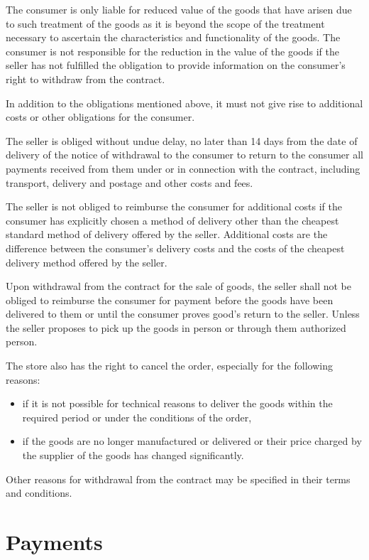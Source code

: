 \documentclass[thesis=M,english]{FITthesis}[2019/12/23]
\begin{document}
The consumer is only liable for reduced value of the goods that have arisen due to such treatment of the goods as it is beyond the scope of the treatment necessary to ascertain the characteristics and functionality of the goods. The consumer is not responsible for the reduction in the value of the goods if the seller has not fulfilled the obligation to provide information on the consumer's right to withdraw from the contract.

In addition to the obligations mentioned above, it must not give rise to additional costs or other obligations for the consumer.

The seller is obliged without undue delay, no later than 14 days from the date of delivery of the notice of withdrawal to the consumer to return to the consumer all payments received from them under or in connection with the contract, including transport, delivery and postage and other costs and fees.

The seller is not obliged to reimburse the consumer for additional costs if the consumer has explicitly chosen a method of delivery other than the cheapest standard method of delivery offered by the seller. Additional costs are the difference between the consumer's delivery costs and the costs of the cheapest delivery method offered by the seller.

Upon withdrawal from the contract for the sale of goods, the seller shall not be obliged to reimburse the consumer for payment before the goods have been delivered to them or until the consumer proves good's return to the seller. Unless the seller proposes to pick up the goods in person or through them authorized person.

The store also has the right to cancel the order, especially for the following reasons:
\begin{itemize}
\item if it is not possible for technical reasons to deliver the goods within the required period or under the conditions of the order,
\item if the goods are no longer manufactured or delivered or their price charged by the supplier of the goods has changed significantly.
\end{itemize}
Other reasons for withdrawal from the contract may be specified in their terms and conditions.

\label{paymentmethods}
\section{Payments}
\end{document}
